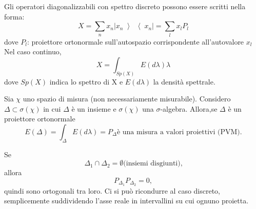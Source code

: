 



%

Gli operatori diagonalizzabili con spettro discreto possono essere scritti nella forma:
\begin{equation*}
X=\sum_{n}x_{n}|x_{n}\left\rangle\right\langle x_{n}|=\sum_{l}x_{l}P_{l}
\end{equation*}
dove $P_{l}$: proiettore ortonormale sull'autospazio corrispondente all'autovalore $x_{l}$
Nel caso continuo,
\begin{equation*}
X=\int_{Sp(X)}E(d\lambda)\lambda
\end{equation*}
dove $Sp(X)$ indica lo spettro di X e $E(d\lambda)$ la densità spettrale.

Sia $\chi$ uno spazio di misura (non necessariamente misurabile).
Considero $\Delta\subset\sigma(\chi)$ in cui $\Delta$ è un insieme e $\sigma(\chi)$ una $\sigma$-algebra.
Allora,se $\Delta$  è un proiettore ortonormale
\begin {equation*}
E(\Delta)=\int_\Delta E(d\lambda)=P_{\Delta}  \textrm{è una misura a valori proiettivi (PVM).}
\end{equation*}

Se 
\begin{equation*}
\Delta_{1}\cap\Delta_{2}=\emptyset \textrm{(insiemi disgiunti),}
\end{equation*} 
allora 
\begin{equation*}
P_{\Delta_{1}}P_{\Delta_{2}}=0,
\end{equation*}
quindi sono ortogonali tra loro.
Ci si può ricondurre al caso discreto, semplicemente suddividendo l'asse reale in intervallini su cui ognuno proietta.

